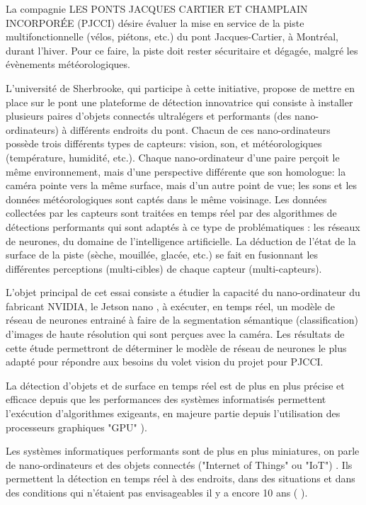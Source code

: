 ﻿\par La compagnie LES PONTS JACQUES CARTIER ET CHAMPLAIN INCORPORÉE (PJCCI) désire évaluer la mise en service de la piste multifonctionnelle (vélos, piétons, etc.) du pont Jacques-Cartier, à Montréal, durant l'hiver. Pour ce faire, la piste doit rester sécuritaire et dégagée, malgré les évènements météorologiques.
\par L'université de Sherbrooke, qui participe à cette initiative, propose de mettre en place sur le pont une plateforme de détection innovatrice qui consiste à installer plusieurs paires d'objets connectés ultralégers et performants (des nano-ordinateurs) à différents endroits du pont. Chacun de ces nano-ordinateurs possède trois différents types de capteurs: vision, son, et météorologiques (température, humidité, etc.). Chaque nano-ordinateur d'une paire perçoit le même environnement, mais d'une perspective différente que son homologue: la caméra pointe vers la même surface, mais d'un autre point de vue; les sons et les données météorologiques sont captés dans le même voisinage. Les données collectées par les capteurs sont traitées en temps réel par des algorithmes de détections performants qui sont adaptés à ce type de problématiques : les réseaux de neurones, du domaine de l'intelligence artificielle. La déduction de l'état de la surface de la piste (sèche, mouillée, glacée, etc.) se fait en fusionnant les différentes perceptions (multi-cibles) de chaque capteur (multi-capteurs).
\par L'objet principal de cet essai consiste a étudier la capacité du nano-ordinateur du fabricant NVIDIA, le Jetson nano \cite{nvidia_jetson_2019}, à exécuter, en temps réel, un modèle de réseau de neurones entrainé à faire de la segmentation sémantique (classification) d'images de haute résolution qui sont perçues avec la caméra. Les résultats de cette étude permettront de déterminer le modèle de réseau de neurones le plus adapté pour répondre aux besoins du volet vision du projet pour PJCCI. 
\par La détection d'objets et de surface en temps réel est de plus en plus précise et efficace depuis que les performances des systèmes informatisés permettent l'exécution d'algorithmes exigeants, en majeure partie depuis l'utilisation des processeurs graphiques "GPU" \cite{chong_real-time_1992} \cite{dettmers_deep_2015} \cite{beam_deep_2017} \cite{jiaconda_concise_2019} \cite{jia_real-time_2020} \cite{kurenkov_brief_2015}). 
\par Les systèmes informatiques performants sont de plus en plus miniatures, on parle de nano-ordinateurs et des objets connectés ("Internet of Things" ou "IoT") \cite{blanco-filgueira_deep_2019} \cite{sharma_history_2019}. Ils permettent la détection en temps réel à des endroits, dans des situations et dans des conditions qui n'étaient pas envisageables il y a encore 10 ans (\cite{jia_real-time_2020} \cite{bernas_edge_2017} \cite{abouzahir_iot-empowered_2017} \cite{blanco-filgueira_deep_2019}).
